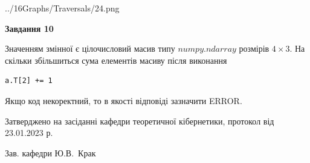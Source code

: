 \documentclass[12pt, ukrainian]{article}
\begin{document}
{\begin {large}
\begin{center}
	{../16Graphs/Traversals/24.png}
\end{center}\par
\newpage

{\begin {center}\textbf{Завдання 10}\end {center}}\par
Значенням змінної  є цілочисловий масив типу $numpy.ndarray$ розмірів $4{\times}3$. На скільки збільшиться сума елементів масиву  після виконання
\begin{verbatim}
a.T[2] += 1
\end{verbatim}


Якщо код некоректний, то в якості відповіді зазначити ERROR.\par
\newpage


\end {large}
}
{\smallskip \begin {small} Затверджено на засіданні кафедри теоретичної кібернетики, протокол  від   23.01.2023 р.\par\smallskip\smallskip
{\parbox {6.5 cm}{Зав. кафедри \dotfill Ю.В.~Крак}} \end{small}}
\end{document}
